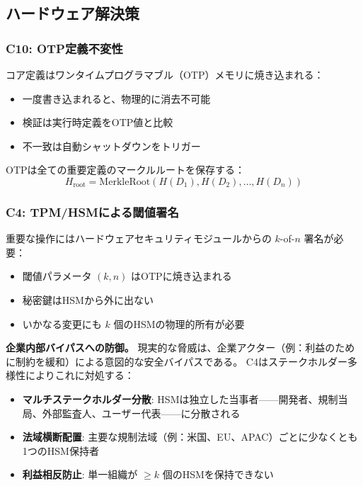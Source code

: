 \documentclass[11pt,a4paper]{article}
\begin{document}
\subsection{ハードウェア解決策}

\subsubsection{C10: OTP定義不変性}

コア定義はワンタイムプログラマブル（OTP）メモリに焼き込まれる：
\begin{itemize}
    \item 一度書き込まれると、物理的に消去不可能
    \item 検証は実行時定義をOTP値と比較
    \item 不一致は自動シャットダウンをトリガー
\end{itemize}

OTPは全ての重要定義のマークルルートを保存する：
\begin{equation}
H_{\text{root}} = \text{MerkleRoot}(H(D_1), H(D_2), \ldots, H(D_n))
\end{equation}

\subsubsection{C4: TPM/HSMによる閾値署名}

重要な操作にはハードウェアセキュリティモジュールからの $k$-of-$n$ 署名が必要：
\begin{itemize}
    \item 閾値パラメータ $(k, n)$ はOTPに焼き込まれる
    \item 秘密鍵はHSMから外に出ない
    \item いかなる変更にも $k$ 個のHSMの物理的所有が必要
\end{itemize}

\textbf{企業内部バイパスへの防御。}
現実的な脅威は、企業アクター（例：利益のために制約を緩和）による意図的な安全バイパスである。
C4はステークホルダー多様性によりこれに対処する：

\begin{itemize}
    \item \textbf{マルチステークホルダー分散}: HSMは独立した当事者——開発者、規制当局、外部監査人、ユーザー代表——に分散される
    \item \textbf{法域横断配置}: 主要な規制法域（例：米国、EU、APAC）ごとに少なくとも1つのHSM保持者
    \item \textbf{利益相反防止}: 単一組織が $\geq k$ 個のHSMを保持できない
\end{itemize}
\end{document}
